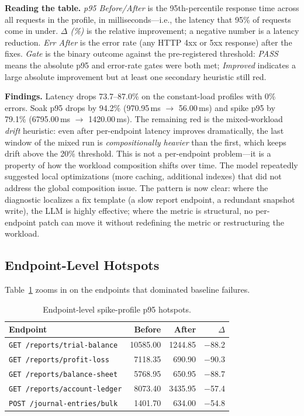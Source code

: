 \documentclass[conference,letterpaper]{IEEEtran}
\begin{document}
\textbf{Reading the table.} \emph{p95 Before/After} is the 95th-percentile response time across all requests in the profile, in milliseconds---i.e., the latency that 95\% of requests come in under. \emph{$\Delta$ (\%)} is the relative improvement; a negative number is a latency reduction. \emph{Err After} is the error rate (any HTTP 4xx or 5xx response) after the fixes. \emph{Gate} is the binary outcome against the pre-registered threshold: \emph{PASS} means the absolute p95 and error-rate gates were both met; \emph{Improved} indicates a large absolute improvement but at least one secondary heuristic still red.

\textbf{Findings.} Latency drops 73.7--87.0\% on the constant-load profiles with 0\% errors. Soak p95 drops by 94.2\% (970.95\,ms $\rightarrow$ 56.00\,ms) and spike p95 by 79.1\% (6795.00\,ms $\rightarrow$ 1420.00\,ms). The remaining red is the mixed-workload \emph{drift} heuristic: even after per-endpoint latency improves dramatically, the last window of the mixed run is \emph{compositionally heavier} than the first, which keeps drift above the 20\% threshold. This is not a per-endpoint problem---it is a property of how the workload composition shifts over time. The model repeatedly suggested local optimizations (more caching, additional indexes) that did not address the global composition issue. The pattern is now clear: where the diagnostic localizes a fix template (a slow report endpoint, a redundant snapshot write), the LLM is highly effective; where the metric is structural, no per-endpoint patch can move it without redefining the metric or restructuring the workload.

\subsection{Endpoint-Level Hotspots}\label{sec:hotspots}
Table~\ref{tab:hotspots} zooms in on the endpoints that dominated baseline failures.

\begin{table}[t]
\caption{Endpoint-level spike-profile p95 hotspots.}
\label{tab:hotspots}
\centering
\scriptsize
\setlength{\tabcolsep}{2.5pt}
\begin{tabular}{@{}lrrr@{}}
\toprule
Endpoint & Before & After & $\Delta$ \\
\midrule
\texttt{GET /reports/trial-balance}  & 10585.00 & 1244.85 & $-$88.2 \\
\texttt{GET /reports/profit-loss}    &  7118.35 &  690.90 & $-$90.3 \\
\texttt{GET /reports/balance-sheet}  &  5768.95 &  650.95 & $-$88.7 \\
\texttt{GET /reports/account-ledger} &  8073.40 & 3435.95 & $-$57.4 \\
\texttt{POST /journal-entries/bulk}  &  1401.70 &  634.00 & $-$54.8 \\
\bottomrule
\end{tabular}
\end{table}
\end{document}
